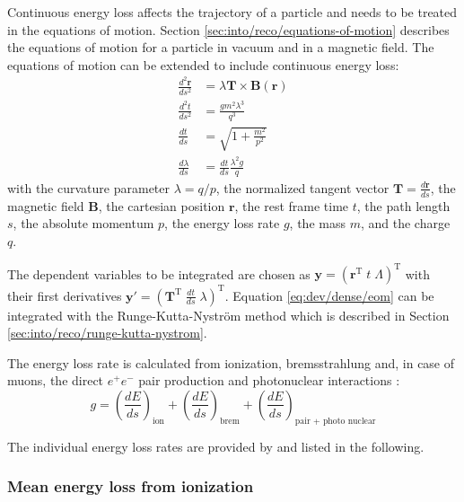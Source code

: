 Continuous energy loss affects the trajectory of a particle and needs to be treated in the equations of motion. Section \ref{sec:into/reco/equations-of-motion} describes the equations of motion for a particle in vacuum and in a magnetic field. The equations of motion can be extended to include continuous energy loss:
\begin{align}
    \frac{d^2\mathbf{r}}{ds^2} &= \lambda \mathbf{T} \times \mathbf{B}(\mathbf{r}) \\
    \frac{d^2t}{ds^2} &= \frac{g m^2 \lambda^3}{q^3} \\
    \frac{dt}{ds} &= \sqrt{1 + \frac{m^2}{p^2}} \\
    \frac{d\lambda}{ds} &= \frac{dt}{ds} \frac{\lambda^2 g}{q}
    \label{eq:dev/dense/eom}
\end{align}
with the curvature parameter $\lambda = q / p$, the normalized tangent vector $\mathbf{T} =\frac{d\mathbf{r}}{ds}$, the magnetic field $\mathbf{B}$, the cartesian position $\mathbf{r}$, the rest frame time $t$, the path length $s$, the absolute momentum $p$, the energy loss rate $g$, the mass $m$, and the charge $q$.

The dependent variables to be integrated are chosen as $\mathbf{y} = (\mathbf{r}^\mathrm{T} \; t \; \Lambda)^\mathrm{T}$ with their first derivatives $\mathbf{y}' = (\mathbf{T}^\mathrm{T} \; \frac{dt}{ds} \; \lambda)^\mathrm{T}$. Equation \ref{eq:dev/dense/eom} can be integrated with the Runge-Kutta-Nyström method which is described in Section \ref{sec:into/reco/runge-kutta-nystrom}.

The energy loss rate is calculated from ionization, bremsstrahlung and, in case of muons, the direct $e^+e^-$ pair production and photonuclear interactions \cite{pub-2008-003}:
\begin{equation}
    g = \left( \frac{dE}{ds} \right)_{\text{ion}} + \left( \frac{dE}{ds} \right)_{\text{brem}} + \left( \frac{dE}{ds} \right)_{\text{pair + photo nuclear}}
\end{equation}

The individual energy loss rates are provided by \textcite{pub-2008-003} and listed in the following.

\subsubsection{Mean energy loss from ionization}

